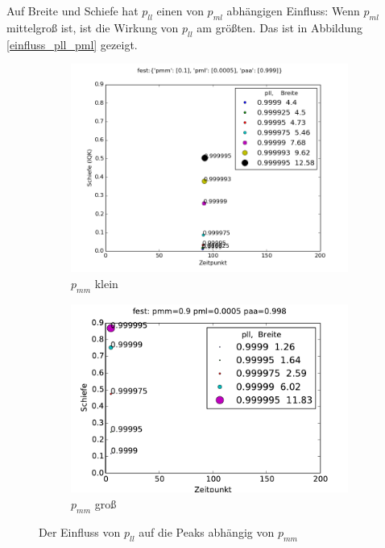 Auf Breite und Schiefe hat $p_{ll}$ einen von $p_{ml}$ abhängigen Einfluss: Wenn $p_{ml}$ mittelgroß ist, ist die Wirkung von $p_{ll}$ am größten. Das ist in Abbildung \ref{einfluss_pll_pml} gezeigt.

\begin{figure}[h]
\begin{subfigure}[b]{0.49\textwidth}
\includegraphics[width=\textwidth]{bilder/pll/3fest_01_00005_0999_p}
\caption{$p_{mm}$ klein}
\end{subfigure}
\begin{subfigure}[b]{0.49\textwidth}
\includegraphics[width=\textwidth]{bilder/pll/3fest_09_00005_0999_p}
\caption{$p_{mm}$ groß}
\end{subfigure}
\caption{Der Einfluss von $p_{ll}$ auf die Peaks abhängig von $p_{mm}$}
\label{einfluss_pll_pmm}
\end{figure}

